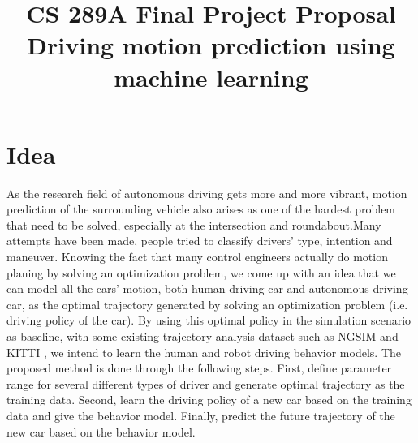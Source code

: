 \documentclass[conference]{IEEEtran}
\begin{document}
\title{CS 289A Final Project Proposal\\
Driving motion prediction using machine learning
}
\author{
\and
{}
\and
{}
\and
{}
}

\maketitle


\section{Idea}
As the research field of autonomous driving gets more and more vibrant, motion prediction of the surrounding vehicle also arises as one of the hardest problem that need to be solved, especially at the intersection and roundabout.Many attempts have been made, people tried to classify drivers' type, intention and maneuver. Knowing the fact that many control engineers actually do motion planing by solving an optimization problem, we come up with an idea that we can model all the cars' motion, both human driving car and autonomous driving car, as the optimal trajectory generated by solving an optimization problem (i.e. driving policy of the car). By using this optimal policy in the simulation scenario as baseline, with some existing trajectory analysis dataset such as NGSIM \cite{b1} and KITTI \cite{b2}, we intend to learn the human and robot driving behavior models. The proposed method is done through the following steps. First, define parameter range for several different types of driver and generate optimal trajectory as the training data. Second, learn the driving policy of a new car based on the training data and give the behavior model. Finally, predict the future trajectory of the new car based on the behavior model.
\end{document}
